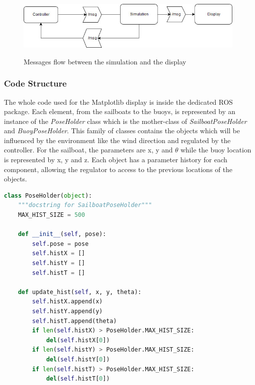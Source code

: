 \documentclass[a4paper]{report}
\begin{document}
\begin{figure}[H]
  \centering
  \includegraphics[scale = 0.6]{image/index.jpg}
  \label{Flow}
  \caption{Messages flow between the simulation and the display }
\end{figure}

\subsubsection{Code Structure}

The whole code used for the Matplotlib display is inside the dedicated ROS package. Each element, from the sailboats to the buoys, is represented by an instance of the \textit{PoseHolder} class which is the mother-class of \textit{SailboatPoseHolder} and \textit{BuoyPoseHolder}. This family of classes contains the objects which will be influenced by the environment like the wind direction and regulated by the controller. For the sailboat, the parameters are x, y and $\theta$ while the buoy location is represented by x, y and z. Each object has a parameter history for each component, allowing the regulator to access to the previous locations  of the objects. 


\renewcommand{\lstlistingname}{Code}
\begin{lstlisting}[caption=PoseHolder Class, frame=single,language=Python]
class PoseHolder(object):
    """docstring for SailboatPoseHolder"""
    MAX_HIST_SIZE = 500

    def __init__(self, pose):
        self.pose = pose
        self.histX = []
        self.histY = []
        self.histT = []

    def update_hist(self, x, y, theta):
        self.histX.append(x)
        self.histY.append(y)
        self.histT.append(theta)
        if len(self.histX) > PoseHolder.MAX_HIST_SIZE:
            del(self.histX[0])
        if len(self.histY) > PoseHolder.MAX_HIST_SIZE:
            del(self.histY[0])
        if len(self.histT) > PoseHolder.MAX_HIST_SIZE:
            del(self.histT[0])
\end{lstlisting}
\end{document}
